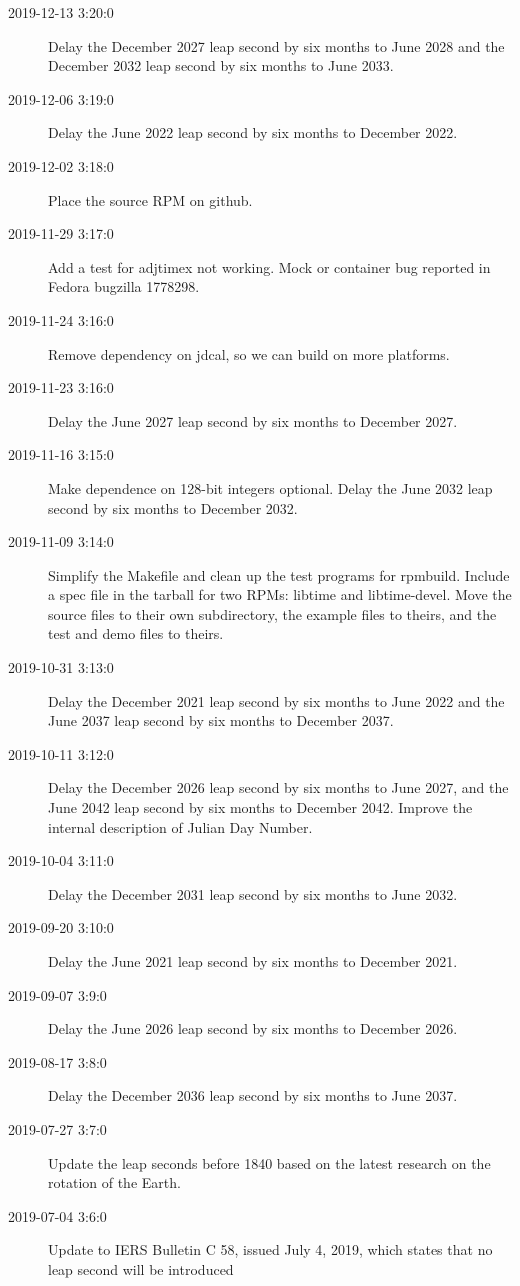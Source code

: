 \documentclass[letterpaper,twoside]{article}
\begin{document}
\begin{description}
\item[2019-12-13 3:20:0]Delay the December 2027 leap second by six months
  to June 2028 and the December 2032 leap second by six months to June 2033.
\item[2019-12-06 3:19:0]Delay the June 2022 leap second by six months
  to December 2022.
\item[2019-12-02 3:18:0]Place the source RPM on github.
\item[2019-11-29 3:17:0]Add a test for adjtimex not working.
  Mock or container bug reported in Fedora bugzilla 1778298.
\item[2019-11-24 3:16:0]Remove dependency on jdcal, so we can build
  on more platforms.
\item[2019-11-23 3:16:0]Delay the June 2027 leap second by six months
  to December 2027.
\item[2019-11-16 3:15:0]Make dependence on 128-bit integers optional.
  Delay the June 2032 leap second by six months to December 2032.
\item[2019-11-09 3:14:0]Simplify the Makefile and clean up the
  test programs for rpmbuild.  Include a spec file in the tarball
  for two RPMs: libtime and libtime-devel.  Move the source
  files to their own subdirectory, the example files to theirs,
  and the test and demo files to theirs.
\item[2019-10-31 3:13:0]Delay the December 2021 leap second by
  six months to June 2022 and the June 2037 leap second by six
  months to December 2037.
\item[2019-10-11 3:12:0]Delay the December 2026 leap second by
  six months to June 2027, and the June 2042 leap second by six
  months to December 2042.  Improve the internal description of
  Julian Day Number.
\item[2019-10-04 3:11:0]Delay the December 2031 leap second by
  six months to June 2032.
\item[2019-09-20 3:10:0]Delay the June 2021 leap second by six
  months to December 2021.
\item[2019-09-07 3:9:0]Delay the June 2026 leap second by six months
  to December 2026.
\item[2019-08-17 3:8:0]Delay the December 2036 leap second by six
  months to June 2037.
\item[2019-07-27 3:7:0]Update the leap seconds before 1840 based
  on the latest research on the rotation of the Earth.
\item[2019-07-04 3:6:0]Update to IERS Bulletin C 58, issued July
  4, 2019, which states that no leap second will be introduced

\end{description}
\end{document}
